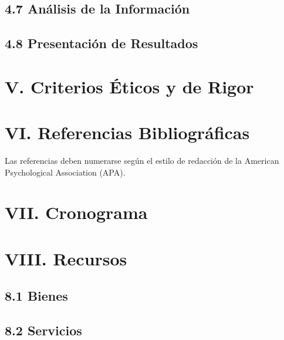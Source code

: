 \documentclass[12pt]{../componentes/uns}
\begin{document}
\subsection*{4.7 Análisis de la Información}
\lipsum[16]

\subsection*{4.8 Presentación de Resultados}
\lipsum[17]

\section*{V. Criterios Éticos y de Rigor}
\lipsum[18]

\section*{VI. Referencias Bibliográficas}
Las referencias deben numerarse según el estilo de redacción de la American Psychological Association (APA).

\section*{VII. Cronograma}
\lipsum[19]

\section*{VIII. Recursos}

\subsection*{8.1 Bienes}
\lipsum[20]

\subsection*{8.2 Servicios}
\lipsum[21]
\end{document}
